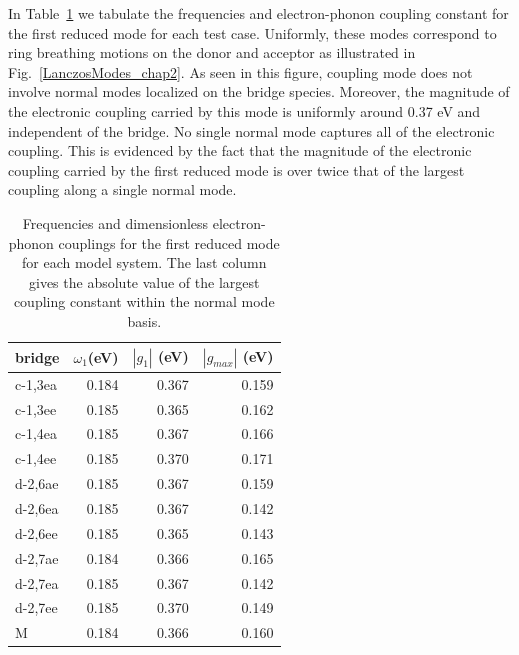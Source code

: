In Table~\ref{table2} we tabulate the frequencies and electron-phonon coupling constant for the first reduced mode for each
test case.  Uniformly, these modes correspond to ring breathing motions on the donor and acceptor as illustrated in Fig.~\ref{LanczosModes_chap2}.
As seen in this figure, coupling mode does not involve normal modes localized on the bridge species.
Moreover, the magnitude of the electronic coupling carried by this mode is uniformly around 0.37 eV  and independent of the bridge.
No single normal mode captures all of the electronic coupling.  This is evidenced by the fact that the magnitude of the electronic coupling
carried by the first reduced mode is over twice that of the largest coupling along a single normal mode.



\begin{table}[t]
\centering
\begin{tabular}{lrrr}
 bridge   &  $\omega_1$(eV)  & $|g_{1}|$ (eV)  &  $|g_{max}|$ (eV)  \\
\hline
\hline
 c-1,3ea  &           0.184  &         0.367  &           0.159  \\
 c-1,3ee  &           0.185  &         0.365  &           0.162  \\
 c-1,4ea  &           0.185  &         0.367  &           0.166  \\
 c-1,4ee  &           0.185  &         0.370  &           0.171  \\
 d-2,6ae  &           0.185  &         0.367  &           0.159  \\
 d-2,6ea  &           0.185  &         0.367  &           0.142  \\
 d-2,6ee  &           0.185  &         0.365  &           0.143  \\
 d-2,7ae  &           0.184  &         0.366  &           0.165  \\
 d-2,7ea  &           0.185  &         0.367  &           0.142  \\
 d-2,7ee  &           0.185  &         0.370  &           0.149  \\
 M           &           0.184  &         0.366  &           0.160  \\
 \hline
\end{tabular}
\caption{Frequencies and dimensionless electron-phonon couplings for
the first reduced mode for each model system. The last column gives the
absolute value of the largest coupling constant within the normal mode basis.
}\label{table2}

\end{table}


